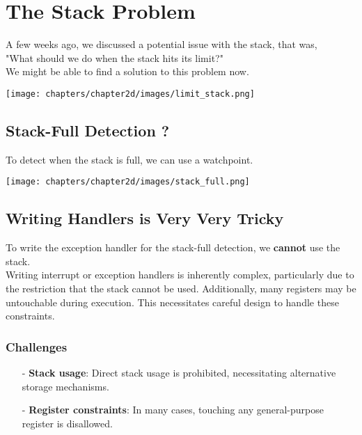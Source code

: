 \section{The Stack Problem}
A few weeks ago, we discussed a potential issue with the stack, that was,\\ "What should we do when the stack hits its limit?" \\
We might be able to find a solution to this problem now.
\begin{center}
    \texttt{[image: chapters/chapter2d/images/limit\_stack.png]}
\end{center}

\newpage
\subsection{Stack-Full Detection ?}
To detect when the stack is full, we can use a watchpoint. \\
\begin{center}
    \texttt{[image: chapters/chapter2d/images/stack\_full.png]}
\end{center}
\subsection{Writing Handlers is Very Very Tricky}
To write the exception handler for the stack-full detection, we \textbf{cannot} use the stack. \\
Writing interrupt or exception handlers is inherently complex, particularly due to the restriction that the stack cannot be used. Additionally, many registers may be untouchable during execution. This necessitates careful design to handle these constraints.

\subsubsection*{Challenges}
\begin{itemize}
    \item[-] \textbf{Stack usage}: Direct stack usage is prohibited, necessitating alternative storage mechanisms.
    \item[-] \textbf{Register constraints}: In many cases, touching any general-purpose register is disallowed.
\end{itemize}

